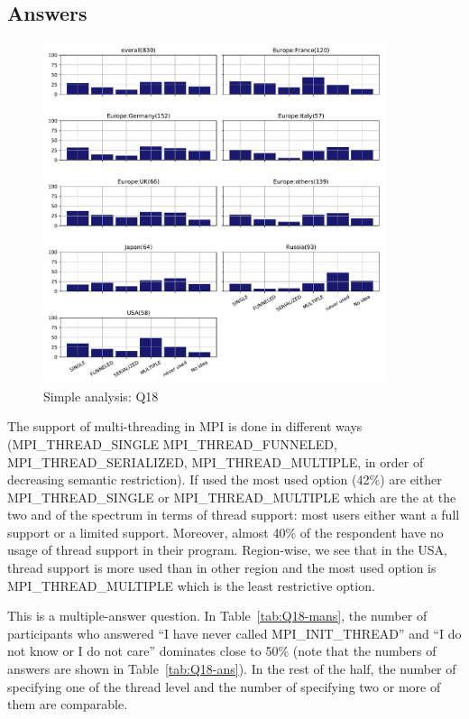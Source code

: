 
\subsection{Answers}


\begin{figure}[htb]
\begin{center}
\includegraphics[width=10cm]{../pdfs/Q18.pdf}
\caption{Simple analysis: Q18}
\label{fig:Q18}
\end{center}
\end{figure}

The support of multi-threading in MPI is done in different ways (MPI\_THREAD\_SINGLE
MPI\_THREAD\_FUNNELED, MPI\_THREAD\_SERIALIZED, MPI\_THREAD\_MULTIPLE, in order of
decreasing semantic restriction). If used the most used option (42\%) are either
MPI\_THREAD\_SINGLE or MPI\_THREAD\_MULTIPLE which are the at the two and of the
spectrum in terms of thread support: most users either want a full support or a
limited support. Moreover, almost 40\% of the respondent have no usage of thread
support in their program. Region-wise, we see that in the USA, thread support is more used
than in other region and the most used option is MPI\_THREAD\_MULTIPLE which is
the least restrictive option. 

This is a multiple-answer question.  In Table~\ref{tab:Q18-mans}, the
number of participants who answered ``I have never called
MPI\_INIT\_THREAD'' and ``I do not know or I do not care'' dominates
close to 50\%  (note that the numbers of answers are shown
in Table~\ref{tab:Q18-ans}). In the rest of the half, the
number of specifying one of the thread level and the number of
specifying two or more of them are comparable. 



